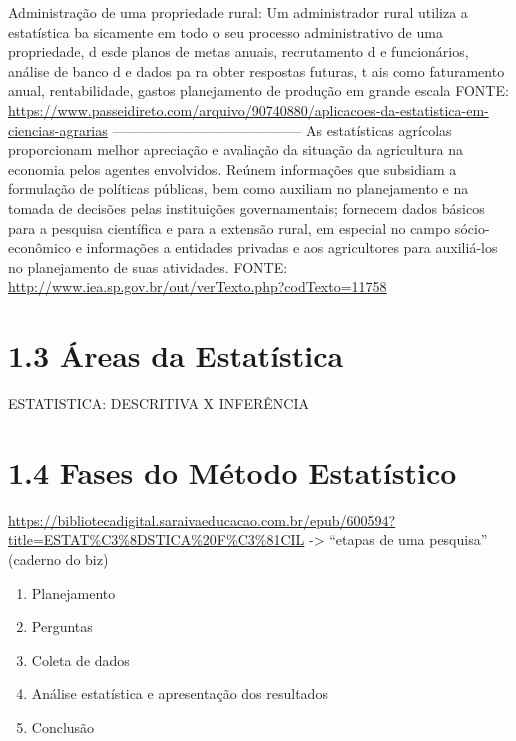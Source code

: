 \documentclass[
]{book}
\providecommand{\tightlist}{%
  \setlength{\itemsep}{0pt}\setlength{\parskip}{0pt}}
\theoremstyle{definition}
\theoremstyle{definition}
\theoremstyle{definition}
\theoremstyle{definition}
\theoremstyle{remark}
\begin{document}
Administração de uma propriedade rural: Um administrador rural utiliza a estatística ba sicamente em todo o seu processo administrativo de uma propriedade, d esde planos de metas anuais, recrutamento d e funcionários, análise de banco d e dados pa ra obter respostas futuras, t ais como faturamento anual, rentabilidade, gastos planejamento de produção em grande escala
FONTE: \url{https://www.passeidireto.com/arquivo/90740880/aplicacoes-da-estatistica-em-ciencias-agrarias}
-----------------------------------------
As estatísticas agrícolas proporcionam melhor apreciação e avaliação da situação da agricultura na economia pelos agentes envolvidos. Reúnem informações que subsidiam a formulação de políticas públicas, bem como auxiliam no planejamento e na tomada de decisões pelas instituições governamentais; fornecem dados básicos para a pesquisa científica e para a extensão rural, em especial no campo sócio-econômico e informações a entidades privadas e aos agricultores para auxiliá-los no planejamento de suas atividades.
FONTE: \url{http://www.iea.sp.gov.br/out/verTexto.php?codTexto=11758}

\hypertarget{uxe1reas-da-estatuxedstica}{%
\section{1.3 Áreas da Estatística}\label{uxe1reas-da-estatuxedstica}}

ESTATISTICA: DESCRITIVA X INFERÊNCIA

\hypertarget{fases-do-muxe9todo-estatuxedstico}{%
\section{1.4 Fases do Método Estatístico}\label{fases-do-muxe9todo-estatuxedstico}}

\url{https://bibliotecadigital.saraivaeducacao.com.br/epub/600594?title=ESTAT\%C3\%8DSTICA\%20F\%C3\%81CIL} -\textgreater{} ``etapas de uma pesquisa'' (caderno do biz)

\begin{enumerate}
\def\labelenumi{\arabic{enumi}.}
\tightlist
\item
  Planejamento
\item
  Perguntas
\item
  Coleta de dados
\item
  Análise estatística e apresentação dos resultados
\item
  Conclusão
\end{enumerate}
\end{document}
